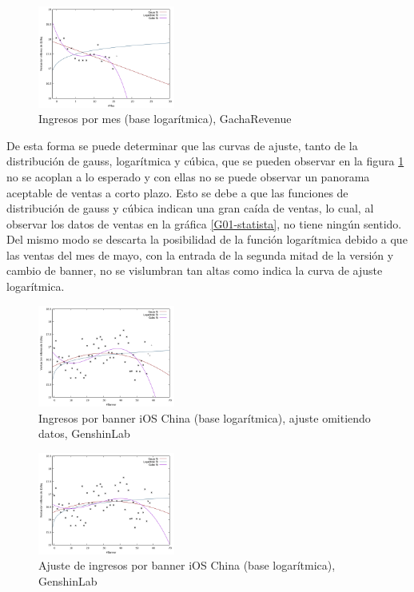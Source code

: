 \documentclass[osajnl,twocolumn,showpacs,superscriptaddress,10pt]{revtex4-2}
\begin{document}
\begin{figure}[H]
    \begin{center}
        \includegraphics[width=0.4\textwidth]{img/GIRev02.pdf}
        \caption{\label{G02-GachaRevenue}Ingresos por mes (base logarítmica), GachaRevenue}
    \end{center}
\end{figure}
De esta forma se puede determinar que las curvas de ajuste, tanto de la distribución de gauss, logarítmica y cúbica, que se pueden observar en la figura \ref{G02-GachaRevenue} no se acoplan a lo esperado y con ellas no se puede observar un panorama aceptable de ventas a corto plazo. Esto se debe a que las funciones de distribución de gauss y cúbica indican una gran caída de ventas, lo cual, al observar los datos de ventas en la gráfica \ref{G01-statista}, no tiene ningún sentido. Del mismo modo se descarta la posibilidad de la función logarítmica debido a que las ventas del mes de mayo, con la entrada de la segunda mitad de la versión y cambio de banner, no se vislumbran tan altas como indica la curva de ajuste logarítmica.
\begin{figure}[H]
    \begin{center}
        \includegraphics[width=0.4\textwidth]{img/GIBannChRev02.pdf}
        \caption{\label{G03-iOS}Ingresos por banner iOS China (base logarítmica), ajuste omitiendo datos, GenshinLab}
    \end{center}
\end{figure}

\begin{figure}[H]
    \begin{center}
        \includegraphics[width=0.4\textwidth]{img/GIBannChRev01.pdf}
        \caption{\label{G04-iOS}Ajuste de ingresos por banner iOS China (base logarítmica), GenshinLab}
    \end{center}
\end{figure}
\end{document}
